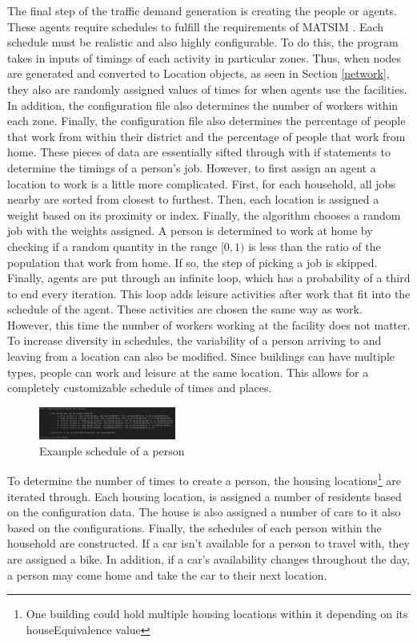 \documentclass[11pt]{article}
\begin{document}
\begin{multicols}{2}
    \quad The final step of the traffic demand generation is creating the people or agents. These agents require schedules to fulfill the requirements of MATSIM \cite{matsim}. Each schedule must be realistic and also highly configurable. To do this, the program takes in inputs of timings of each activity in particular zones. Thus, when nodes are generated and converted to Location objects, as seen in Section \ref{network}, they also are randomly assigned values of times for when agents use the facilities. In addition, the configuration file also determines the number of workers within each zone. Finally, the configuration file also determines the percentage of people that work from within their district and the percentage of people that work from home. These pieces of data are essentially sifted through with if statements to determine the timings of a person's job. However, to first assign an agent a location to work is a little more complicated. First, for each household, all jobs nearby are sorted from closest to furthest. Then, each location is assigned a weight based on its proximity or index. Finally, the algorithm chooses a random job with the weights assigned. A person is determined to work at home by checking if a random quantity in the range \([0, 1)\) is less than the ratio of the population that work from home. If so, the step of picking a job is skipped. Finally, agents are put through an infinite loop, which has a probability of a third to end every iteration. This loop adds leisure activities after work that fit into the schedule of the agent. These activities are chosen the same way as work. However, this time the number of workers working at the facility does not matter. To increase diversity in schedules, the variability of a person arriving to and leaving from a location can also be modified. Since buildings can have multiple types, people can work and leisure at the same location. This allows for a completely customizable schedule of times and places.

    \begin{figure}[H]
        \centering
        \includegraphics[width=0.4\textwidth]{images/examplepopulation.png}
        \caption{Example schedule of a person}
        \label{fig:example-schedule}
    \end{figure}

    \quad To determine the number of times to create a person, the housing locations\footnote{One building could hold multiple housing locations within it depending on its houseEquivalence value} are iterated through. Each housing location, is assigned a number of residents based on the configuration data. The house is also assigned a number of cars to it also based on the configurations. Finally, the schedules of each person within the household are constructed. If a car isn't available for a person to travel with, they are assigned a bike. In addition, if a car's availability changes throughout the day, a person may come home and take the car to their next location. \\
    

\end{multicols}
\end{document}
